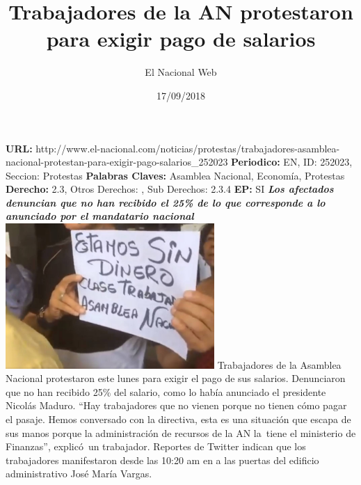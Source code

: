 \documentclass{article}%
\title{\textbf{Trabajadores de la AN protestaron para exigir pago de salarios}}%
\author{El Nacional Web}%
\date{17/09/2018}%
\begin{document}
%
\normalsize%
\maketitle%
\textbf{URL: }%
http://www.el{-}nacional.com/noticias/protestas/trabajadores{-}asamblea{-}nacional{-}protestan{-}para{-}exigir{-}pago{-}salarios\_252023\newline%
%
\textbf{Periodico: }%
EN, %
ID: %
252023, %
Seccion: %
Protestas\newline%
%
\textbf{Palabras Claves: }%
Asamblea Nacional, Economía, Protestas\newline%
%
\textbf{Derecho: }%
2.3, %
Otros Derechos: %
, %
Sub Derechos: %
2.3.4\newline%
%
\textbf{EP: }%
SI\newline%
\newline%
%
\textbf{\textit{Los afectados denuncian que no han recibido el 25\% de lo que corresponde a lo anunciado por el mandatario nacional}}%
\newline%
\newline%
%
\includegraphics[width=300px]{94.jpg}%
\newline%
%
Trabajadores de la Asamblea Nacional protestaron este lunes para exigir el pago de sus salarios. Denunciaron que no han recibido 25\% del salario, como lo había anunciado el presidente Nicolás Maduro.%
\newline%
%
“Hay trabajadores que no vienen porque no tienen cómo pagar el pasaje. Hemos conversado con la directiva, esta es una situación que escapa de sus manos porque la administración de recursos de la AN la~tiene el ministerio de Finanzas”, explicó~un trabajador.%
\newline%
%
Reportes de Twitter indican que los trabajadores manifestaron desde las 10:20 am en a las puertas del edificio administrativo José María Vargas.%
\newline%
%
\end{document}
